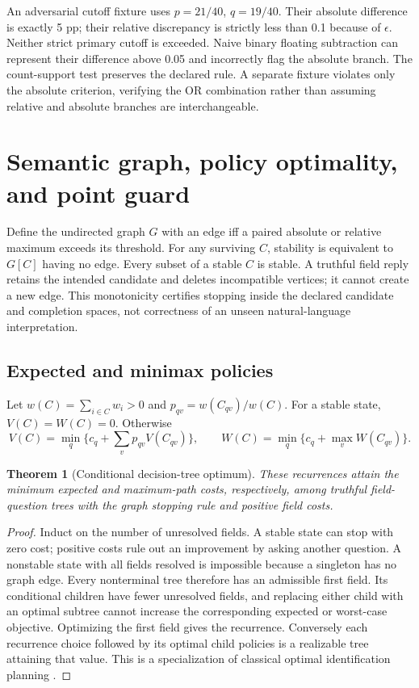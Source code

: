\documentclass[10pt,letterpaper]{article}
\newtheorem{theorem}{Theorem}
\begin{document}
An adversarial cutoff fixture uses $p=21/40$, $q=19/40$. Their absolute difference is exactly 5 pp; their relative discrepancy is strictly less than 0.1 because of $\epsilon$. Neither strict primary cutoff is exceeded. Naive binary floating subtraction can represent their difference above 0.05 and incorrectly flag the absolute branch. The count-support test preserves the declared rule. A separate fixture violates only the absolute criterion, verifying the OR combination rather than assuming relative and absolute branches are interchangeable.

\section{Semantic graph, policy optimality, and point guard}
Define the undirected graph $G$ with an edge iff a paired absolute or relative maximum exceeds its threshold. For any surviving $C$, stability is equivalent to $G[C]$ having no edge. Every subset of a stable $C$ is stable. A truthful field reply retains the intended candidate and deletes incompatible vertices; it cannot create a new edge. This monotonicity certifies stopping inside the declared candidate and completion spaces, not correctness of an unseen natural-language interpretation.

\subsection{Expected and minimax policies}
Let $w(C)=\sum_{i\in C}w_i>0$ and $p_{qv}=w(C_{qv})/w(C)$. For a stable state, $V(C)=W(C)=0$. Otherwise
\[
 V(C)=\min_q\{c_q+\sum_vp_{qv}V(C_{qv})\},\qquad
 W(C)=\min_q\{c_q+\max_vW(C_{qv})\}.
\]
\begin{theorem}[Conditional decision-tree optimum]
These recurrences attain the minimum expected and maximum-path costs, respectively, among truthful field-question trees with the graph stopping rule and positive field costs.
\end{theorem}
\begin{proof}
Induct on the number of unresolved fields. A stable state can stop with zero cost; positive costs rule out an improvement by asking another question. A nonstable state with all fields resolved is impossible because a singleton has no graph edge. Every nonterminal tree therefore has an admissible first field. Its conditional children have fewer unresolved fields, and replacing either child with an optimal subtree cannot increase the corresponding expected or worst-case objective. Optimizing the first field gives the recurrence. Conversely each recurrence choice followed by its optimal child policies is a realizable tree attaining that value. This is a specialization of classical optimal identification planning \cite{garey}.
\end{proof}
\end{document}
